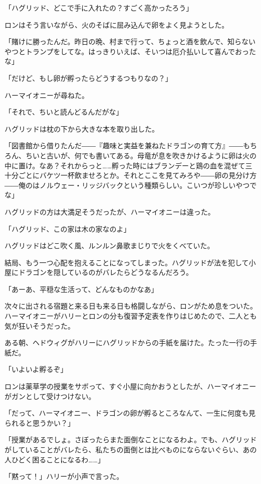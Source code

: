 \documentclass[10pt,a4paper]{article}
\begin{document}
\begin{CJK}{UTF8}{min}
「ハグリッド、どこで手に入れたの？すごく高かったろう」

ロンはそう言いながら、火のそばに屈み込んで卵をよく見ようとした。

「賭けに勝ったんだ。昨日の晩、村まで行って、ちょっと酒を飲んで、知らないやつとトランプをしてな。はっきりいえば、そいつは厄介払いして喜んでおったな」

「だけど、もし卵が孵ったらどうするつもりなの？」

ハーマイオニーが尋ねた。

「それで、ちいと読んどるんだがな」

ハグリッドは枕の下から大きな本を取り出した。

「図書館から借りたんだ――『趣味と実益を兼ねたドラゴンの育て方』――もちろん、ちいと古いが、何でも書いてある。母竜が息を吹きかけるように卵は火の中に置け。なあ？それからっと……孵った時にはブランデーと鶏の血を混ぜて三十分ごとにバケツ一杯飲ませろとか。それとここを見てみろや――卵の見分け方――俺のはノルウェー・リッジバックという種類らしい。こいつが珍しいやつでな」

ハグリッドの方は大満足そうだったが、ハーマイオニーは違った。

「ハグリッド、この家は木の家なのよ」

ハグリッドはどこ吹く風、ルンルン鼻歌まじりで火をくべていた。



結局、もう一つ心配を抱えることになってしまった。ハグリッドが法を犯して小屋にドラゴンを隠しているのがバレたらどうなるんだろう。

「あーあ、平穏な生活って、どんなものかなあ」

次々に出される宿題と来る日も来る日も格闘しながら、ロンがため息をついた。ハーマイオニーがハリーとロンの分も復習予定表を作りはじめたので、二人とも気が狂いそうだった。

ある朝、ヘドウィグがハリーにハグリッドからの手紙を届けた。たった一行の手紙だ。

「いよいよ孵るぞ」

ロンは薬草学の授業をサボって、すぐ小屋に向かおうとしたが、ハーマイオニーがガンとして受けつけない。

「だって、ハーマイオニー、ドラゴンの卵が孵るところなんて、一生に何度も見られると思うかい？」

「授業があるでしょ。さぼったらまた面倒なことになるわよ。でも、ハグリッドがしていることがバレたら、私たちの面倒とは比べものにならないぐらい、あの人ひどく困ることになるわ……」

「黙って！」ハリーが小声で言った。


\end{CJK}
\end{document}
